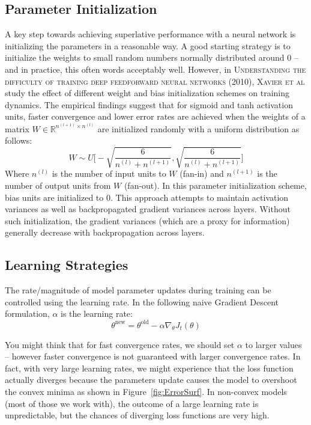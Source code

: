 \documentclass{tufte-handout}
\begin{document}
\subsection{Parameter Initialization}

A key step towards achieving superlative performance with a neural network is initializing the parameters in a reasonable way.  A good starting strategy is to initialize the weights to small random numbers normally distributed around $0$ -- and in practice, this often words acceptably well.
However, in \textsc{Understanding the difficulty of training deep feedforward neural networks (2010), Xavier et al} study the effect of different weight and bias initialization schemes on training dynamics. The empirical findings suggest that for sigmoid and tanh activation units, faster convergence and lower error rates are achieved when the weights of a matrix $W \in \mathbb{R}^{n^{(l+1)}\times n^{(l)}}$ are initialized randomly with a uniform distribution as follows:
$$W \sim U\bigg[-\sqrt{\frac{6}{n^{(l)} + n^{(l+1)}}}, \sqrt{\frac{6}{n^{(l)} + n^{(l+1)}}}\bigg]$$
Where $n^{(l)}$ is the number of input units to $W$ (fan-in) and  $n^{(l+1)}$ is the number of output units from $W$ (fan-out).
In this parameter initialization scheme, bias units are initialized to $0$. This approach attempts to maintain activation variances as well as backpropagated gradient variances across layers. Without such initialization, the gradient variances (which are a proxy for information) generally decrease with backpropagation across layers.
\subsection{Learning Strategies}
The rate/magnitude of model parameter updates during training can be controlled using the learning rate. In the following naive Gradient Descent formulation, $\alpha$ is the learning rate:
$$ \theta^{\text{new}} = \theta^{\text{old}} - \alpha \nabla_{\theta}J_t(\theta)$$

You might think that for fast convergence rates, we should set $\alpha$ to larger values -- however faster convergence is not guaranteed with larger convergence rates. In fact, with very large learning rates, we might experience that the loss function actually diverges because the parameters update causes the model to overshoot the convex minima as shown in Figure~\ref{fig:ErrorSurf}. In non-convex models (most of those we work with), the outcome of a large learning rate is unpredictable, but the chances of diverging loss functions are very high.
\end{document}
